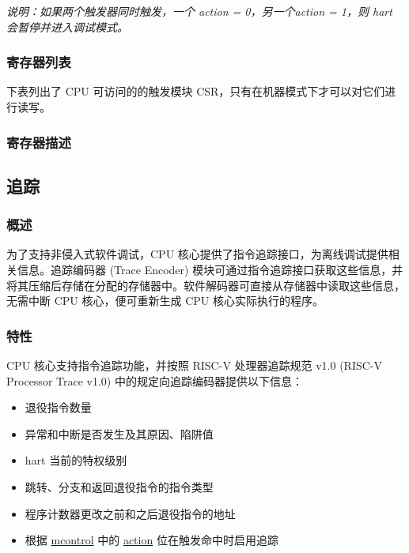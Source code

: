 \documentclass[main\_\_CN.tex]{subfiles}
\begin{document}
\textit{说明：如果两个触发器同时触发，一个 action = 0，另一个action = 1，则 hart 会暂停并进入调试模式。}


\hypertarget{riscvcpu-hwt-reg-summ}{}
\subsubsection{寄存器列表}
\label{sec:riscvcpu-hwt-reg-summ}


下表列出了 CPU 可访问的的触发模块 CSR，只有在机器模式下才可以对它们进行读写。




\subsubsection{寄存器描述}




\newpage
\subsection{追踪}
\label{sec:riscvcpu-trace}

\subsubsection{概述}
\label{sec:riscvcpu-trace-overview}
为了支持非侵入式软件调试，CPU 核心提供了指令追踪接口，为离线调试提供相关信息。追踪编码器 (Trace Encoder) 模块可通过指令追踪接口获取这些信息，并将其压缩后存储在分配的存储器中。软件解码器可直接从存储器中读取这些信息，无需中断 CPU 核心，便可重新生成 CPU 核心实际执行的程序。


\subsubsection{特性}
\label{sec:riscvcpu-trace-features}

CPU 核心支持指令追踪功能，并按照 RISC-V 处理器追踪规范 v1.0 (RISC-V Processor Trace v1.0) 中的规定向追踪编码器提供以下信息：

\begin{itemize}
    \item 退役指令数量
    \item 异常和中断是否发生及其原因、陷阱值
    \item hart 当前的特权级别
    \item 跳转、分支和返回退役指令的指令类型
    \item 程序计数器更改之前和之后退役指令的地址
    \item 根据 \hyperref[regdesc:MCONTROL]{mcontrol} 中的 \hyperref[regdesc:MCONTROL]{action} 位在触发命中时启用追踪
\end{itemize}
\end{document}

